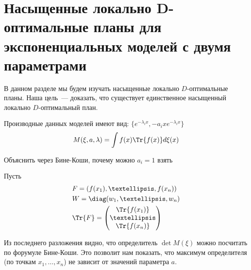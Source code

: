 \section{Насыщенные локально D-оптимальные планы для экспоненциальных моделей с двумя параметрами}

В данном разделе мы будем изучать насыщенные локально $D$-оптимальные планы. Наша цель — доказать, что существует единственное насыщенный локально $D$-оптимальный план.

Производные данных моделей имеют вид:
$\{e^{-\lambda_i x}, -a_i x e^{-\lambda_i x} \}$
$$M(\xi, a, \lambda) = \int f(x)\Tr{f(x)}d\xi(x)$$

{ \color{blue} Объяснить через Бине-Коши, почему можно $a_i = 1$ взять }

Пусть
\begin{equation}
\begin{split}
 &F = (f(x_1), …, f(x_n)) \\
 & W = \diag(w_1, …,w_n) \\
 & \Tr{F} = \begin{pmatrix} \Tr{f(x_1)} \\ … \\ \Tr{f(x_n)} \end{pmatrix} 
 \end{split}
 \end{equation}

 Из последнего разложения видно, что определитель $\det M(\xi)$ можно посчитать по форумуле Бине-Коши.  
 Это позволит нам показать, что максимум определителя (по точкам $x_1, …, x_n$) не зависит от значений параметра $a$.

